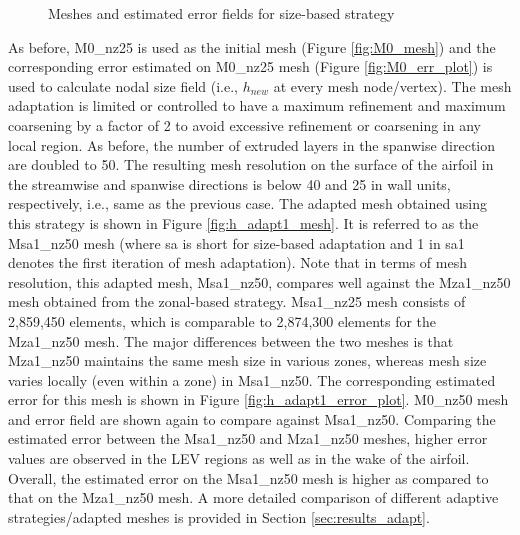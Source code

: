 \begin{figure}[H]
\caption{Meshes and estimated error fields for size-based strategy}
\end{figure}

As before, M0\_nz25 is used as the initial mesh (Figure \ref{fig:M0_mesh}) and the corresponding error estimated on M0\_nz25 mesh (Figure \ref{fig:M0_err_plot}) is used to calculate nodal size field (i.e., $h_{new}$ at every mesh node/vertex). The mesh adaptation is limited or controlled to have a maximum refinement and maximum coarsening by a factor of 2 to avoid excessive refinement or coarsening in any local region. As before, the number of extruded layers in the spanwise direction are doubled to 50.
The resulting mesh resolution on the surface of the airfoil in the streamwise and spanwise directions is below 40 and 25 in wall units, respectively, i.e., same as the previous case.
The adapted mesh obtained using this strategy is shown in Figure \ref{fig:h_adapt1_mesh}. It is referred to as the Msa1\_nz50 mesh (where sa is short for size-based adaptation and 1 in sa1 denotes the first iteration of mesh adaptation). Note that in terms of mesh resolution, this adapted mesh, Msa1\_nz50, compares well against the Mza1\_nz50 mesh obtained from the zonal-based strategy. Msa1\_nz25 mesh consists of 2,859,450 elements, which is comparable to 2,874,300 elements for the Mza1\_nz50 mesh. The major differences between the two meshes is that Mza1\_nz50 maintains the same mesh size in various zones, whereas mesh size varies locally (even within a zone) in Msa1\_nz50.
The corresponding estimated error for this mesh is shown in Figure \ref{fig:h_adapt1_error_plot}. M0\_nz50 mesh and error field are shown again to compare against Msa1\_nz50. Comparing the estimated error between the Msa1\_nz50 and Mza1\_nz50 meshes, higher error values are observed in the LEV regions as well as in the wake of the airfoil. Overall, the estimated error on the Msa1\_nz50 mesh is higher as compared to that on the Mza1\_nz50 mesh. A more detailed comparison of different adaptive strategies/adapted meshes is provided in Section \ref{sec:results_adapt}.
